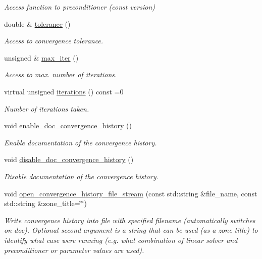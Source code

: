 \begin{DoxyCompactItemize}
\begin{DoxyCompactList}\small\item\em Access function to preconditioner (const version) \end{DoxyCompactList}\item 
double \& \hyperlink{classoomph_1_1IterativeLinearSolver_aa76d0f94116e2bfa615652b9de9b1af7}{tolerance} ()
\begin{DoxyCompactList}\small\item\em Access to convergence tolerance. \end{DoxyCompactList}\item 
unsigned \& \hyperlink{classoomph_1_1IterativeLinearSolver_adecee5890003a9178366799cb22b63e0}{max\+\_\+iter} ()
\begin{DoxyCompactList}\small\item\em Access to max. number of iterations. \end{DoxyCompactList}\item 
virtual unsigned \hyperlink{classoomph_1_1IterativeLinearSolver_a5fe7f7b5e4847fdbd4f95d3875ec7a46}{iterations} () const =0
\begin{DoxyCompactList}\small\item\em Number of iterations taken. \end{DoxyCompactList}\item 
void \hyperlink{classoomph_1_1IterativeLinearSolver_a57419aaa61fde5b7f802454a4ec396cd}{enable\+\_\+doc\+\_\+convergence\+\_\+history} ()
\begin{DoxyCompactList}\small\item\em Enable documentation of the convergence history. \end{DoxyCompactList}\item 
void \hyperlink{classoomph_1_1IterativeLinearSolver_a7a5b846d3df565490022348a53bbf511}{disable\+\_\+doc\+\_\+convergence\+\_\+history} ()
\begin{DoxyCompactList}\small\item\em Disable documentation of the convergence history. \end{DoxyCompactList}\item 
void \hyperlink{classoomph_1_1IterativeLinearSolver_a1c5e176ff2c767f2dc2168f9789f9c8f}{open\+\_\+convergence\+\_\+history\+\_\+file\+\_\+stream} (const std\+::string \&file\+\_\+name, const std\+::string \&zone\+\_\+title=\char`\"{}\char`\"{})
\begin{DoxyCompactList}\small\item\em Write convergence history into file with specified filename (automatically switches on doc). Optional second argument is a string that can be used (as a zone title) to identify what case we\textquotesingle{}re running (e.\+g. what combination of linear solver and preconditioner or parameter values are used). \end{DoxyCompactList}\item 

\end{DoxyCompactItemize}
